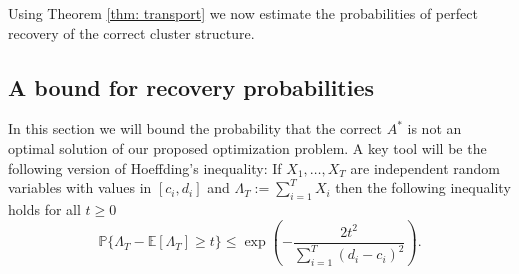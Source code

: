 \documentclass[12pt]{amsart}
\theoremstyle{remark}
\newcommand{\PP}{\mathbb{P}}
\newcommand{\EE}{\mathbb{E}}
\begin{document}
Using  Theorem \ref{thm: transport} we now estimate the probabilities of perfect recovery of the correct cluster structure. 



\subsection{A bound for recovery probabilities}

In this section we will bound the probability that the correct $A^*$ is not an optimal solution of our proposed optimization problem. A key tool will be the following version of Hoeffding's inequality: If $X_1,\dots, X_T$ are independent random variables with values in $[c_i,d_i]$ and $\Lambda_T:=\sum_{i=1}^T X_i$ then the following inequality holds for all $t\geq 0$ 
\[\PP\{\Lambda_T-\EE[\Lambda_T]\geq t\}\leq \exp\left(-\frac{2t^2}{\sum_{i=1}^T (d_i-c_i)^2}\right).\]
\end{document}
